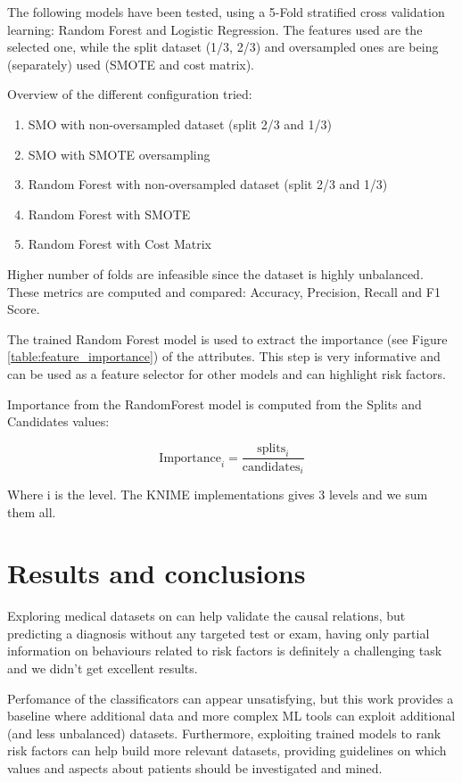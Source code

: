The following models have been tested, using a 5-Fold stratified cross validation learning: Random Forest and Logistic Regression. The features used are the selected one, while the split dataset (1/3, 2/3) and oversampled ones are being (separately) used (SMOTE and cost matrix).

Overview of the different configuration tried:
\begin{enumerate}
    \item SMO with non-oversampled dataset (split 2/3 and 1/3)
    \item SMO with SMOTE oversampling
    \item Random Forest with non-oversampled dataset (split 2/3 and 1/3)
    \item Random Forest with SMOTE
    \item Random Forest with Cost Matrix
    \end{enumerate}

Higher number of folds are infeasible since the dataset is highly unbalanced. These metrics are computed and compared: Accuracy, Precision, Recall and F1 Score.

The trained Random Forest model is used to extract the importance (see Figure \ref{table:feature_importance}) of the attributes. This step is very informative and can be used as a feature selector for other models and can highlight risk factors.

Importance from the RandomForest model is computed from the Splits and Candidates values:

$$\text{Importance}_i = \frac{\text{splits}_i}{\text{candidates}_i} $$

Where i is the level. The KNIME implementations gives 3 levels and we sum them all.

\section{Results and conclusions}

Exploring medical datasets on can help validate the causal relations, but predicting a diagnosis without any targeted test or exam, having only partial information on behaviours related to risk factors is definitely a challenging task and we didn't get excellent results.

Perfomance of the classificators can appear unsatisfying, but this work provides a baseline where additional data and more complex ML tools can exploit additional (and less unbalanced) datasets. Furthermore, exploiting trained models to rank risk factors can help build more relevant datasets, providing guidelines on which values and aspects about patients should be investigated and mined.


